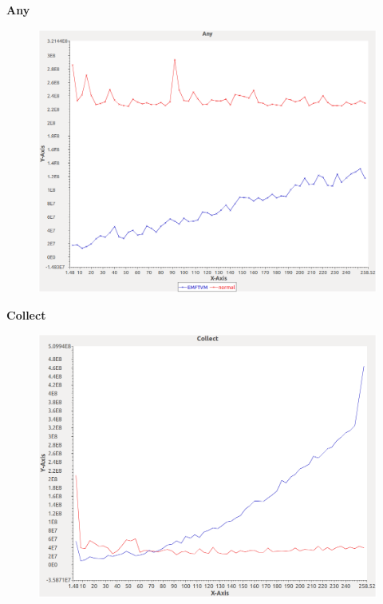 \noindent\textbf{Any}

\begin{figure}[h]
\centering
\includegraphics[width=\textwidth]{../graphs/bag/Any}
\end{figure}
\pagebreak

\noindent\textbf{Collect}

\begin{figure}[h]
\centering
\includegraphics[width=\textwidth]{../graphs/bag/Collect}
\end{figure}
\pagebreak

